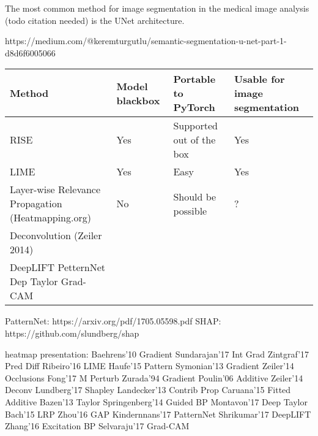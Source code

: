 The most common method for image segmentation in the medical image analysis (todo citation needed) is the UNet\cite{todo} architecture.



https://medium.com/@keremturgutlu/semantic-segmentation-u-net-part-1-d8d6f6005066


\begin{tabular}{|l|l|l|l|}
\hline
 \textbf{Method} & \textbf{Model blackbox} & \textbf{Portable to PyTorch} & \textbf{Usable for image segmentation} \\ \hline
 RISE & Yes & Supported out of the box & Yes\\ \hline
 LIME & Yes & Easy & Yes \\ \hline
 Layer-wise Relevance Propagation (Heatmapping.org) & No & Should be possible & ? \\ \hline
 Deconvolution (Zeiler 2014) \\ \hline
 DeepLIFT
 PetternNet
 Dep Taylor
 Grad-CAM
 
\end{tabular}

PatternNet: https://arxiv.org/pdf/1705.05598.pdf
SHAP: https://github.com/slundberg/shap

heatmap presentation:
Baehrens'10 Gradient
Sundarajan'17 Int Grad
Zintgraf'17 Pred Diff
Ribeiro'16 LIME
Haufe'15 Pattern
Symonian'13 Gradient
Zeiler'14 Occlusions
Fong'17 M Perturb
Zurada'94 Gradient
Poulin'06 Additive
Zeiler'14 Deconv
Lundberg'17 Shapley
Landecker'13 Contrib Prop
Caruana'15 Fitted Additive
Bazen'13 Taylor
Springenberg'14 Guided BP
Montavon'17 Deep Taylor
Bach'15 LRP
Zhou'16 GAP
Kindernnans'17 PatternNet
Shrikumar'17 DeepLIFT
Zhang'16 Excitation BP
Selvaraju'17 Grad-CAM
